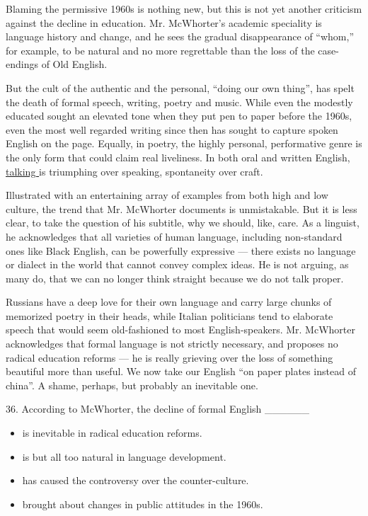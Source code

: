 \documentclass[UTF8,11pt]{ctexart}
\begin{document}
Blaming the permissive 1960s is nothing new, but this is not yet another criticism against the decline in education. Mr. McWhorter’s academic speciality is language history and change, and he sees the gradual disappearance of “whom,” for example, to be natural and no more regrettable than the loss of the case-endings of Old English.


But the cult of the authentic and the personal, “doing our own thing”, has spelt the death of formal speech, writing, poetry and music. While even the modestly educated sought an elevated tone when they put pen to paper before the 1960s, even the most well regarded writing since then has sought to capture spoken English on the page. Equally, in poetry, the highly personal, performative genre is the only form that could claim real liveliness. In both oral and written English, \uline{talking }is triumphing over speaking, spontaneity over craft.


Illustrated with an entertaining array of examples from both high and low culture, the trend that Mr. McWhorter documents is unmistakable. But it is less clear, to take the question of his subtitle, why we should, like, care. As a linguist, he acknowledges that all varieties of human language, including non-standard ones like Black English, can be powerfully expressive — there exists no language or dialect in the world that cannot convey complex ideas. He is not arguing, as many do, that we can no longer think straight because we do not talk proper.


Russians have a deep love for their own language and carry large chunks of memorized poetry in their heads, while Italian politicians tend to elaborate speech that would seem old-fashioned to most English-speakers. Mr. McWhorter acknowledges that formal language is not strictly necessary, and proposes no radical education reforms — he is really grieving over the loss of something beautiful more than useful. We now take our English “on paper plates instead of china”. A shame, perhaps, but probably an inevitable one.


36. According to McWhorter, the decline of formal English \_\_\_\_\_\_


\begin{itemize}[leftmargin=2em,itemsep=.2em,topsep=.4em]\item[A.] is inevitable in radical education reforms.
\item[B.] is but all too natural in language development.
\item[C.] has caused the controversy over the counter-culture.
\item[D.] brought about changes in public attitudes in the 1960s.
\end{itemize}
\end{document}
